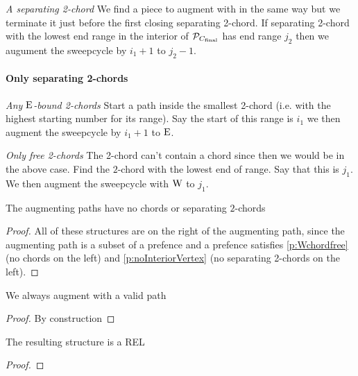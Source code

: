     \emph{A separating 2-chord}
    We find a piece to augment with in the same way  but we terminate it just before the first closing separating 2-chord. If separating 2-chord with the lowest end range in the interior of $\P_{C_\text{final}}$ has end range $j_2$ then we augument the sweepcycle by  $i_1 +1$ to $j_2 -1$.

    \paragraph{Only separating 2-chords}
    \emph{Any $\pE$-bound 2-chords} 
    Start a path inside the smallest 2-chord (i.e. with the highest starting number for its range). Say the start of this range is $i_1$ we then augment the sweepcycle by $i_1 +1$ to $\pE$.

    \emph{Only free 2-chords}
    The 2-chord can't contain a chord since then we would be in the above case.
    Find the $2$-chord with the lowest end of range. Say that this is $j_1$. We then augment the sweepcycle with $\pW$ to $j_1$.

    \begin{lemma}
      The augmenting paths have no chords or separating $2$-chords
    \end{lemma}
    \begin{proof}
        All of these structures are on the right of the augmenting path, since the augmenting path is a subset of a prefence and a  prefence satisfies \ref{p:Wchordfree} (no chords on the left) and \ref{p:noInteriorVertex} (no separating 2-chords on the left).



    \end{proof}

    \begin{lemma}
      We always augment with a valid path
    \end{lemma}
    \begin{proof}
      By construction
    \end{proof}

    \begin{lemma}
      \label{lm:sweep:REL}
      The resulting structure is a REL
    \end{lemma}

    \begin{proof}

    \end{proof}

